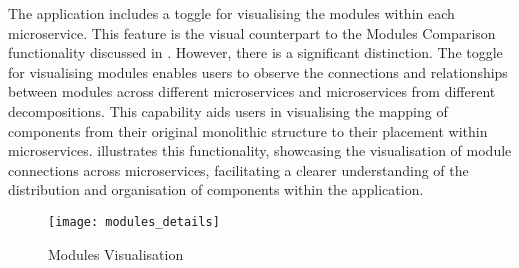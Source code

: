 The application includes a toggle for visualising the modules within each
microservice. This feature is the visual counterpart to the Modules Comparison
functionality discussed in .
However, there is a significant distinction. The toggle for visualising modules
enables users to observe the connections and relationships between modules
across different microservices and microservices from different decompositions.
This capability aids users in visualising the mapping of components from their
original monolithic structure to their placement within microservices.
 illustrates this functionality, showcasing the
visualisation of module connections across microservices, facilitating a
clearer understanding of the distribution and organisation of components within
the application.

\begin{figure*}[!htb]
  \caption{Modules Visualisation} \label{fig:modules_visualisation}
  \centering
  \texttt{[image: modules\_details]}
\end{figure*}
